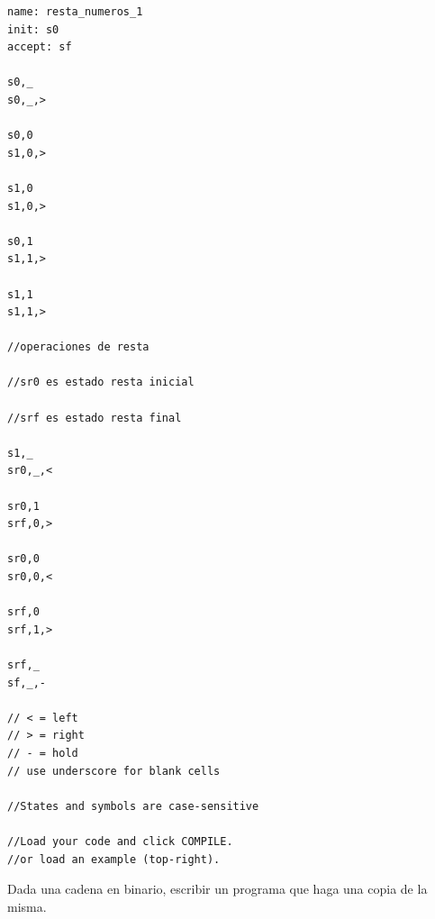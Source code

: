 \documentclass[12pt]{report}
\newcounter{it}
\theoremstyle{largebreak}
\begin{document}
\begin{lstlisting}
name: resta_numeros_1
init: s0
accept: sf

s0,_
s0,_,>

s0,0
s1,0,>

s1,0
s1,0,>

s0,1
s1,1,>

s1,1
s1,1,>

//operaciones de resta

//sr0 es estado resta inicial

//srf es estado resta final

s1,_
sr0,_,<

sr0,1
srf,0,>

sr0,0
sr0,0,<

srf,0
srf,1,>

srf,_
sf,_,-

// < = left
// > = right
// - = hold
// use underscore for blank cells

//States and symbols are case-sensitive

//Load your code and click COMPILE.
//or load an example (top-right).
\end{lstlisting}

\begin{excer}
    Dada una cadena en binario, escribir un programa que haga una copia de la misma.
\end{excer}
\end{document}
